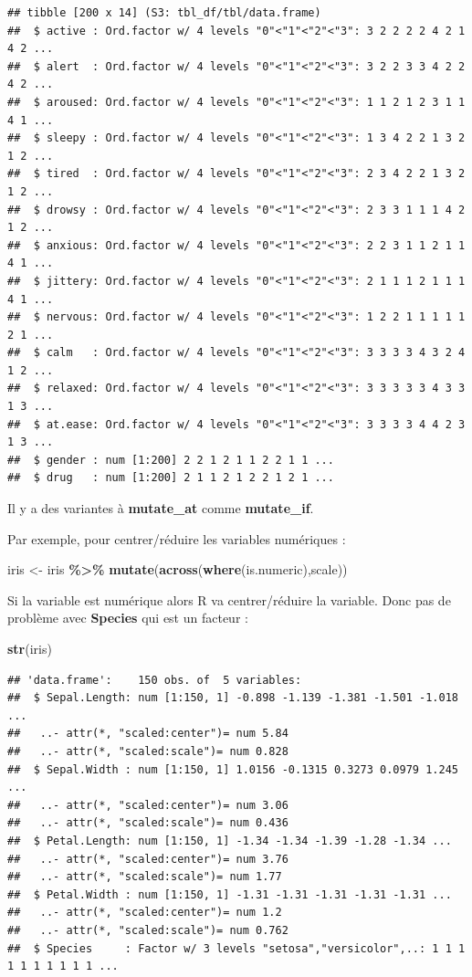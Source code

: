 \documentclass[
]{book}
\newenvironment{Shaded}{\begin{snugshade}}{\end{snugshade}}
\newcommand{\FunctionTok}[1]{\textcolor[rgb]{0.13,0.29,0.53}{\textbf{#1}}}
\newcommand{\NormalTok}[1]{#1}
\newcommand{\OtherTok}[1]{\textcolor[rgb]{0.56,0.35,0.01}{#1}}
\newcommand{\SpecialCharTok}[1]{\textcolor[rgb]{0.81,0.36,0.00}{\textbf{#1}}}
\begin{document}
\begin{verbatim}
## tibble [200 x 14] (S3: tbl_df/tbl/data.frame)
##  $ active : Ord.factor w/ 4 levels "0"<"1"<"2"<"3": 3 2 2 2 2 4 2 1 4 2 ...
##  $ alert  : Ord.factor w/ 4 levels "0"<"1"<"2"<"3": 3 2 2 3 3 4 2 2 4 2 ...
##  $ aroused: Ord.factor w/ 4 levels "0"<"1"<"2"<"3": 1 1 2 1 2 3 1 1 4 1 ...
##  $ sleepy : Ord.factor w/ 4 levels "0"<"1"<"2"<"3": 1 3 4 2 2 1 3 2 1 2 ...
##  $ tired  : Ord.factor w/ 4 levels "0"<"1"<"2"<"3": 2 3 4 2 2 1 3 2 1 2 ...
##  $ drowsy : Ord.factor w/ 4 levels "0"<"1"<"2"<"3": 2 3 3 1 1 1 4 2 1 2 ...
##  $ anxious: Ord.factor w/ 4 levels "0"<"1"<"2"<"3": 2 2 3 1 1 2 1 1 4 1 ...
##  $ jittery: Ord.factor w/ 4 levels "0"<"1"<"2"<"3": 2 1 1 1 2 1 1 1 4 1 ...
##  $ nervous: Ord.factor w/ 4 levels "0"<"1"<"2"<"3": 1 2 2 1 1 1 1 1 2 1 ...
##  $ calm   : Ord.factor w/ 4 levels "0"<"1"<"2"<"3": 3 3 3 3 4 3 2 4 1 2 ...
##  $ relaxed: Ord.factor w/ 4 levels "0"<"1"<"2"<"3": 3 3 3 3 3 4 3 3 1 3 ...
##  $ at.ease: Ord.factor w/ 4 levels "0"<"1"<"2"<"3": 3 3 3 3 4 4 2 3 1 3 ...
##  $ gender : num [1:200] 2 2 1 2 1 1 2 2 1 1 ...
##  $ drug   : num [1:200] 2 1 1 2 1 2 2 1 2 1 ...
\end{verbatim}

Il y a des variantes à \textbf{mutate\_at} comme \textbf{mutate\_if}.

Par exemple, pour centrer/réduire les variables numériques :

\begin{Shaded}
\begin{Highlighting}[]
\NormalTok{iris }\OtherTok{\textless{}{-}}\NormalTok{ iris }\SpecialCharTok{\%\textgreater{}\%} \FunctionTok{mutate}\NormalTok{(}\FunctionTok{across}\NormalTok{(}\FunctionTok{where}\NormalTok{(is.numeric),scale))}
\end{Highlighting}
\end{Shaded}

Si la variable est numérique alors R va centrer/réduire la variable. Donc pas
de problème avec \textbf{Species} qui est un facteur :

\begin{Shaded}
\begin{Highlighting}[]
\FunctionTok{str}\NormalTok{(iris)}
\end{Highlighting}
\end{Shaded}

\begin{verbatim}
## 'data.frame':    150 obs. of  5 variables:
##  $ Sepal.Length: num [1:150, 1] -0.898 -1.139 -1.381 -1.501 -1.018 ...
##   ..- attr(*, "scaled:center")= num 5.84
##   ..- attr(*, "scaled:scale")= num 0.828
##  $ Sepal.Width : num [1:150, 1] 1.0156 -0.1315 0.3273 0.0979 1.245 ...
##   ..- attr(*, "scaled:center")= num 3.06
##   ..- attr(*, "scaled:scale")= num 0.436
##  $ Petal.Length: num [1:150, 1] -1.34 -1.34 -1.39 -1.28 -1.34 ...
##   ..- attr(*, "scaled:center")= num 3.76
##   ..- attr(*, "scaled:scale")= num 1.77
##  $ Petal.Width : num [1:150, 1] -1.31 -1.31 -1.31 -1.31 -1.31 ...
##   ..- attr(*, "scaled:center")= num 1.2
##   ..- attr(*, "scaled:scale")= num 0.762
##  $ Species     : Factor w/ 3 levels "setosa","versicolor",..: 1 1 1 1 1 1 1 1 1 1 ...
\end{verbatim}
\end{document}
